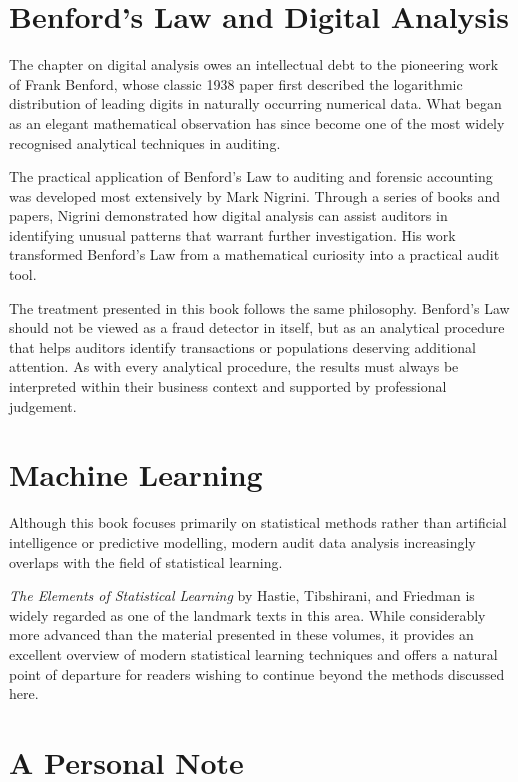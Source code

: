 \section*{Benford's Law and Digital Analysis}

The chapter on digital analysis owes an intellectual debt to the pioneering work of Frank Benford, whose classic 1938 paper first described the logarithmic distribution of leading digits in naturally occurring numerical data. What began as an elegant mathematical observation has since become one of the most widely recognised analytical techniques in auditing.

The practical application of Benford's Law to auditing and forensic accounting was developed most extensively by Mark Nigrini. Through a series of books and papers, Nigrini demonstrated how digital analysis can assist auditors in identifying unusual patterns that warrant further investigation. His work transformed Benford's Law from a mathematical curiosity into a practical audit tool.

The treatment presented in this book follows the same philosophy. Benford's Law should not be viewed as a fraud detector in itself, but as an analytical procedure that helps auditors identify transactions or populations deserving additional attention. As with every analytical procedure, the results must always be interpreted within their business context and supported by professional judgement.

\section*{Machine Learning}

Although this book focuses primarily on statistical methods rather than artificial intelligence or predictive modelling, modern audit data analysis increasingly overlaps with the field of statistical learning.

\textit{The Elements of Statistical Learning} by Hastie, Tibshirani, and Friedman is widely regarded as one of the landmark texts in this area. While considerably more advanced than the material presented in these volumes, it provides an excellent overview of modern statistical learning techniques and offers a natural point of departure for readers wishing to continue beyond the methods discussed here.

\section*{A Personal Note}

